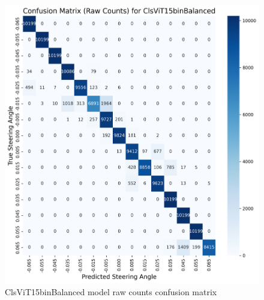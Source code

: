 \begin{figure}[H]
\centering
\includegraphics[width=1\linewidth]{Figures/Results/cm_raw_ClsViT15binBalanced.png}
\caption{ClsViT15binBalanced model raw counts confusion matrix}
\label{fig:cm_raw_ClsViT15binBalanced}
\end{figure}


